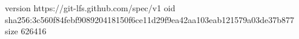 version https://git-lfs.github.com/spec/v1
oid sha256:3c560f84febf908920418150f6ce11d29f9ea42aa103eab121579a03de37b877
size 626416
